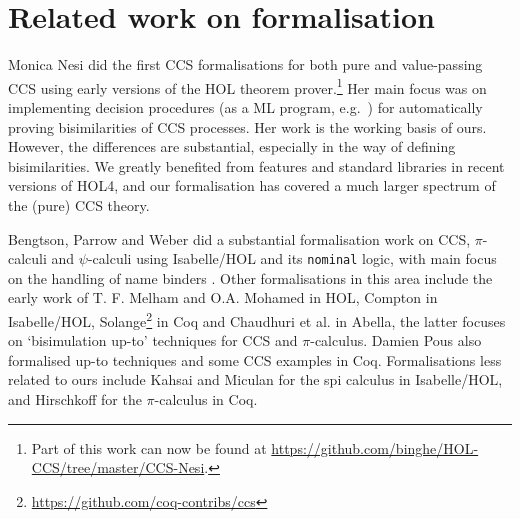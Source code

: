 \section{Related work on formalisation}
\label{s:rel}

Monica Nesi did the first CCS formalisations for both pure and
value-passing CCS \cite{Nesi:1992ve,Nesi:2017wo} using early versions of the HOL
theorem prover.\footnote{Part of this work can now be found at
  \url{https://github.com/binghe/HOL-CCS/tree/master/CCS-Nesi}.}
Her main focus was on implementing decision procedures (as a ML
program, e.g.~\cite{cleaveland1993concurrency}) for
automatically proving bisimilarities of CCS
processes. %
Her work is
  the working basis of ours. However, the differences are substantial, especially in the way of defining
bisimilarities. We greatly benefited from features and standard
libraries in recent versions of HOL4, and our formalisation has
covered a much larger spectrum of the (pure) CCS theory.

Bengtson, Parrow and Weber did a substantial formalisation work
on CCS, $\pi$-calculi
and $\psi$-calculi 
using Isabelle/HOL and its \texttt{nominal} logic, with main focus on the handling of
name binders \cite{bengtson2010formalising,bengtson2007completeness,parrow2009formalising}.
%
Other formalisations in this area include the early work of T. F. Melham
\cite{melham1994mechanized} and O.A. Mohamed
\cite{mohamed1995mechanizing} in HOL, Compton
\cite{compton2005embedding} in Isabelle/HOL,
Solange\footnote{\url{https://github.com/coq-contribs/ccs}} in Coq
and Chaudhuri et al.\;\cite{chaudhuri2015lightweight} in Abella, the latter
focuses on `bisimulation up-to' techniques %
for CCS and $\pi$-calculus.
Damien Pous \cite{pous2007new} also formalised up-to techniques and some CCS examples in
Coq.
Formalisations less related to ours
include Kahsai and Miculan \cite{kahsai2008implementing} for the spi
calculus in Isabelle/HOL, and Hirschkoff \cite{hirschkoff1997full} for the $\pi$-calculus in Coq.

